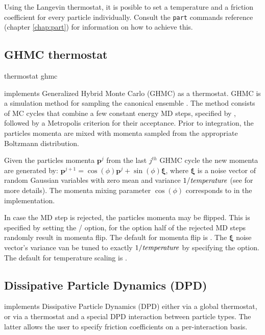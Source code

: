 Using the Langevin thermostat, it is posible to set a temperature and
a friction coefficient for every particle individually. Consult the
\texttt{part} commands reference (chapter \ref{chap:part}) for
information on how to achieve this.

\subsection{GHMC thermostat}

\begin{essyntax}
  thermostat ghmc     
\end{essyntax}

\es implements Generalized Hybrid Monte Carlo (GHMC) as a thermostat. GHMC is a
simulation method for sampling the canonical ensemble \cite{mehlig92}. The
method consists of MC cycles that combine a few constant energy MD steps,
specified by , followed by a Metropolis criterion for their
acceptance. Prior to integration, the particles momenta are mixed with momenta
sampled from the appropriate Boltzmann distribution. 

Given the particles momenta $\mathbf{p}^j$ from the last $j^{th}$
GHMC cycle the new momenta are generated
by: $\mathbf{p}^{j+1}=\cos(\phi)\mathbf{p}^j+\sin(\phi)\pmb{\xi}$, where
$\pmb{\xi}$ is a noise vector of random Gaussian variables with zero mean
and variance $1/\mathrm{\mathit{temperature}}$ (see 
\cite{horowitz91} for more details). The
momenta mixing parameter $\cos(\phi)$ corresponds to  in the
implementation.

In case the MD step is rejected, the particles momenta may be
flipped. This is specified by setting the  /
 option, for the  option half of the
rejected MD steps randomly result in momenta flip. The default for momenta
flip is . The $\pmb{\xi}$ noise vector's variance van be
tuned to exactly $1/\mathrm{\mathit{temperature}}$ by specifying the 
option. The default for temperature scaling is .


\subsection{Dissipative Particle Dynamics (DPD) } \label{sec:DPD}

\es implements Dissipative Particle Dynamics (DPD) either via a global
thermostat, or via a thermostat and a special DPD interaction between
particle types.  The latter allows the user to specify friction
coefficients on a per-interaction basis.

